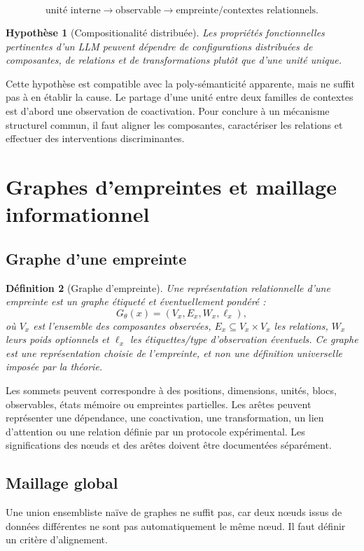 \documentclass[11pt,a4paper]{article}
\newtheorem{definition}{Définition}[section]
\newtheorem{hypothesis}[definition]{Hypothèse}
\theoremstyle{remark}
\newcommand{\1}{\mathbf 1}
\begin{document}
\[
\boxed{\text{unité interne}\to\text{observable}\to\text{empreinte/contextes relationnels}.}
\]

\begin{hypothesis}[Compositionalité distribuée]
Les propriétés fonctionnelles pertinentes d'un LLM peuvent dépendre de configurations distribuées de composantes, de relations et de transformations plutôt que d'une unité unique.
\end{hypothesis}

Cette hypothèse est compatible avec la poly-sémanticité apparente, mais ne suffit pas à en établir la cause. Le partage d'une unité entre deux familles de contextes est d'abord une observation de coactivation. Pour conclure à un mécanisme structurel commun, il faut aligner les composantes, caractériser les relations et effectuer des interventions discriminantes.

\section{Graphes d'empreintes et maillage informationnel}

\subsection{Graphe d'une empreinte}
\begin{definition}[Graphe d'empreinte]
Une représentation relationnelle d'une empreinte est un graphe étiqueté et éventuellement pondéré :
\[
G_\theta(x)=(V_x,E_x,W_x,\ell_x),
\]
où $V_x$ est l'ensemble des composantes observées, $E_x\subseteq V_x\times V_x$ les relations, $W_x$ leurs poids optionnels et $\ell_x$ les étiquettes/type d'observation éventuels. Ce graphe est une représentation choisie de l'empreinte, et non une définition universelle imposée par la théorie.
\end{definition}

Les sommets peuvent correspondre à des positions, dimensions, unités, blocs, observables, états mémoire ou empreintes partielles. Les arêtes peuvent représenter une dépendance, une coactivation, une transformation, un lien d'attention ou une relation définie par un protocole expérimental. Les significations des nœuds et des arêtes doivent être documentées séparément.

\subsection{Maillage global}
Une union ensembliste naïve de graphes ne suffit pas, car deux nœuds issus de données différentes ne sont pas automatiquement le même nœud. Il faut définir un critère d'alignement.
\end{document}

